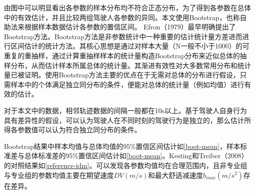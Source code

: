 
由图中可以明显看出各参数的样本分布均不符合正态分布，为了得到各参数在总体中的有效估计，并且比较两组驾驶人各参数的异同。本文使用Bootstrap，也称自助法来根据样本数据估计各参数的置信区间。
Efron（1979）\cite{Efron1979}最早明确提出了Bootstrap方法。Bootstrap方法是非参数统计中一种重要的估计统计量方差进而进行区间估计的统计方法。其核心思想是通过对样本大量（N一般不小于1000）的可重复的重抽样，通过计算重抽样样本的统计量构造Bootstrap分布来近似总体的抽样分布，从而估计样本所属总体的统计量。其渐进有效性对大多数常用分布和统计量已被证明。使用Bootstrap方法主要的优点在于无需对总体的分布进行假设，只需样本中的个体满足独立同分布的条件，便能对总体的统计量（例如均值）进行有效的估计。

对于本文中的数据，相邻轨迹数据的间隔一般都在10s以上。基于驾驶人自身行为具有差异性的假设，可以认为驾驶人在不同时刻的驾驶行为是独立的，那么估计所得各参数值可以认为符合独立同分布的条件。


Bootstrap结果中样本均值与总体均值的95\%置信区间估计如\autoref{boot-mean}，样本标准差与总体标准差的95\%置信区间估计如\autoref{boot-mean}。Kesting和Treiber（2008）\cite{Kesting2008}的对照结果如\autoref{reference-idm}。可以发现各参数均值均在合理范围内，且非专业组与专业组的参数均值主要在期望速度$DV(m/s)$和最大舒适减速度$b_{max}(m/s^2)$存在差异。

